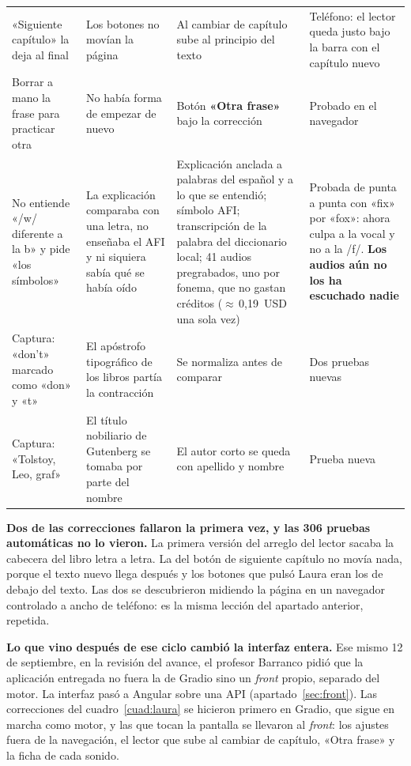 \documentclass[11pt,a4paper]{article}
\begin{document}
\begin{small}
\begin{longtable}{@{}L{3.1cm} L{3.8cm} L{4.2cm} L{2.8cm}@{}}
\addlinespace
«Siguiente capítulo» la deja al final & Los botones no movían la página & Al cambiar de capítulo sube al principio del texto & Teléfono: el lector queda justo bajo la barra con el capítulo nuevo \\
\addlinespace
Borrar a mano la frase para practicar otra & No había forma de empezar de nuevo & Botón \textbf{«Otra frase»} bajo la corrección & Probado en el navegador \\
\addlinespace
No entiende «/w/ diferente a la b» y pide «los símbolos» & La explicación comparaba con una letra, no enseñaba el AFI y ni siquiera sabía qué se había oído & Explicación anclada a palabras del español y a lo que se entendió; símbolo AFI; transcripción de la palabra del diccionario local; 41 audios pregrabados, uno por fonema, que no gastan créditos ($\approx$\,0,19~USD una sola vez) & Probada de punta a punta con «fix» por «fox»: ahora culpa a la vocal y no a la /f/. \textbf{Los audios aún no los ha escuchado nadie} \\
\addlinespace
Captura: «don’t» marcado como «don» y «t» & El apóstrofo tipográfico de los libros partía la contracción & Se normaliza antes de comparar & Dos pruebas nuevas \\
\addlinespace
Captura: «Tolstoy, Leo, graf» & El título nobiliario de Gutenberg se tomaba por parte del nombre & El autor corto se queda con apellido y nombre & Prueba nueva \\
\end{longtable}
\end{small}

\textbf{Dos de las correcciones fallaron la primera vez, y las 306 pruebas automáticas no
lo vieron.} La primera versión del arreglo del lector sacaba la cabecera del libro letra a
letra. La del botón de siguiente capítulo no movía nada, porque el texto nuevo llega
después y los botones que pulsó Laura eran los de debajo del texto. Las dos se
descubrieron midiendo la página en un navegador controlado a ancho de teléfono: es la
misma lección del apartado anterior, repetida.

\textbf{Lo que vino después de ese ciclo cambió la interfaz entera.} Ese mismo 12 de
septiembre, en la revisión del avance, el profesor Barranco pidió que la aplicación
entregada no fuera la de Gradio sino un \emph{front} propio, separado del motor. La
interfaz pasó a Angular sobre una API (apartado~\ref{sec:front}). Las correcciones del
cuadro~\ref{cuad:laura} se hicieron primero en Gradio, que sigue en marcha como motor, y
las que tocan la pantalla se llevaron al \emph{front}: los ajustes fuera de la navegación,
el lector que sube al cambiar de capítulo, «Otra frase» y la ficha de cada sonido.
\end{document}

